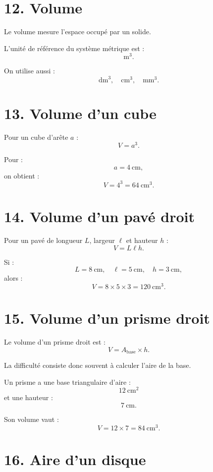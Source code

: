 \section{12. Volume}

Le volume mesure l'espace occupé par un solide.

L'unité de référence du système métrique est :
\[
\text{m}^3.
\]

On utilise aussi :
\[
\text{dm}^3,\quad \text{cm}^3,\quad \text{mm}^3.
\]

\section{13. Volume d'un cube}

Pour un cube d'arête $a$ :
\[
\boxed{V=a^3}.
\]

\begin{exemple}
Pour :
\[
a=4\ \text{cm},
\]
on obtient :
\[
V=4^3=64\ \text{cm}^3.
\]
\end{exemple}

\section{14. Volume d'un pavé droit}

Pour un pavé de longueur $L$, largeur $\ell$ et hauteur $h$ :
\[
\boxed{V=L\ell h}.
\]

\begin{exemple}
Si :
\[
L=8\ \text{cm},\quad \ell=5\ \text{cm},\quad h=3\ \text{cm},
\]
alors :
\[
V=8\times5\times3=120\ \text{cm}^3.
\]
\end{exemple}

\section{15. Volume d'un prisme droit}

Le volume d'un prisme droit est :
\[
\boxed{V=A_{\text{base}}\times h}.
\]

La difficulté consiste donc souvent à calculer l'aire de la base.

\begin{exemple}
Un prisme a une base triangulaire d'aire :
\[
12\ \text{cm}^2
\]
et une hauteur :
\[
7\ \text{cm}.
\]

Son volume vaut :
\[
V=12\times7=84\ \text{cm}^3.
\]
\end{exemple}

\section{16. Aire d'un disque}

